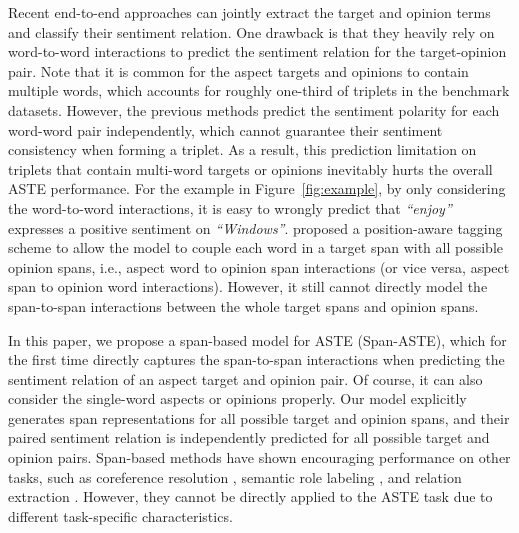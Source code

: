 \documentclass[11pt,a4paper]{article}
\begin{document}
Recent end-to-end approaches \cite{wu-etal-2020-grid,Xu2020PositionAwareTF,zhang-etal-2020-multi-task}
can jointly extract the target and opinion terms and classify their sentiment relation. One drawback is that they heavily rely on word-to-word interactions to predict the sentiment relation for the target-opinion pair.
Note that it is common for the aspect targets and opinions to contain multiple words, which accounts for roughly one-third of triplets in the benchmark datasets. 
However, the previous methods \cite{wu-etal-2020-grid,zhang-etal-2020-multi-task}
predict the sentiment polarity for each word-word pair independently, which cannot guarantee their sentiment consistency when forming a triplet.
As a result, this prediction limitation on triplets that contain multi-word targets or opinions
inevitably hurts the overall ASTE performance.
For the example in Figure~\ref{fig:example}, by only considering the word-to-word interactions, it is easy to wrongly predict that 
\textit{``enjoy''} expresses a positive sentiment on \textit{``Windows''}.
\citet{Xu2020PositionAwareTF} proposed a position-aware tagging scheme to allow the model to couple each word in a target span with all possible opinion spans,
i.e., aspect word to opinion span interactions (or vice versa, aspect span to opinion word interactions).
However, it still cannot directly model the span-to-span interactions between the whole target spans and opinion spans. 



In this paper, we propose a span-based model for ASTE (Span-ASTE), which for the first time directly captures the span-to-span interactions when predicting the sentiment relation of an aspect target and opinion pair.
Of course, it can also consider the single-word aspects or opinions properly. 
Our model explicitly generates span representations for all possible target and opinion spans,
and their paired sentiment relation is independently predicted for all possible target and opinion pairs.
Span-based methods have shown encouraging performance on other tasks, such as coreference resolution \cite{lee-etal-2017-end}, semantic role labeling \cite{he-etal-2018-jointly}, and relation extraction \cite{luan-etal-2019-general, Wadden2019EntityRA}.
However, they cannot be directly applied to the ASTE task due to different task-specific characteristics.
\end{document}
